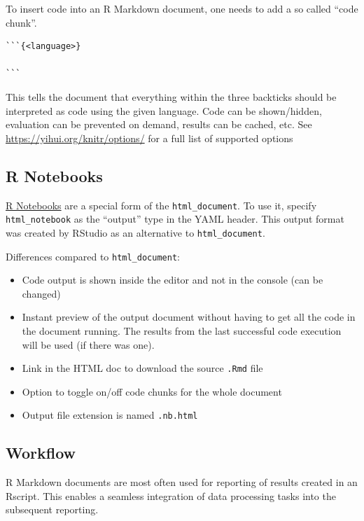 \documentclass[]{book}
\begin{document}
To insert code into an R Markdown document, one needs to add a so called ``code chunk''.

\begin{verbatim}
```{<language>}

```
\end{verbatim}

This tells the document that everything within the three backticks should be interpreted as code using the given language.
Code can be shown/hidden, evaluation can be prevented on demand, results can be cached, etc.
See \url{https://yihui.org/knitr/options/} for a full list of supported options

\hypertarget{r-notebooks}{%
\subsection{R Notebooks}\label{r-notebooks}}

\href{https://bookdown.org/yihui/rmarkdown/notebook.html}{R Notebooks} are a special form of the \texttt{html\_document}.
To use it, specify \texttt{html\_notebook} as the ``output'' type in the YAML header.
This output format was created by RStudio as an alternative to \texttt{html\_document}.

Differences compared to \texttt{html\_document}:

\begin{itemize}
\item
  Code output is shown inside the editor and not in the console (can be changed)
\item
  Instant preview of the output document without having to get all the code in the document running. The results from the last successful code execution will be used (if there was one).
\item
  Link in the HTML doc to download the source \texttt{.Rmd} file
\item
  Option to toggle on/off code chunks for the whole document
\item
  Output file extension is named \texttt{.nb.html}
\end{itemize}

\hypertarget{workflow}{%
\subsection{Workflow}\label{workflow}}

R Markdown documents are most often used for reporting of results created in an Rscript.
This enables a seamless integration of data processing tasks into the subsequent reporting.
\end{document}
